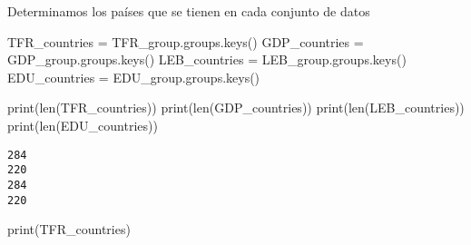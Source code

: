 \documentclass[
  letterpaper,
  DIV=11,
  numbers=noendperiod]{scrreprt}
\newenvironment{Shaded}{\begin{snugshade}}{\end{snugshade}}
\newcommand{\BuiltInTok}[1]{\textcolor[rgb]{0.00,0.23,0.31}{#1}}
\newcommand{\NormalTok}[1]{\textcolor[rgb]{0.00,0.23,0.31}{#1}}
\newcommand{\OperatorTok}[1]{\textcolor[rgb]{0.37,0.37,0.37}{#1}}
\begin{document}
Determinamos los países que se tienen en cada conjunto de datos

\begin{Shaded}
\begin{Highlighting}[]
\NormalTok{TFR\_countries }\OperatorTok{=}\NormalTok{ TFR\_group.groups.keys()}
\NormalTok{GDP\_countries }\OperatorTok{=}\NormalTok{ GDP\_group.groups.keys()}
\NormalTok{LEB\_countries }\OperatorTok{=}\NormalTok{ LEB\_group.groups.keys()}
\NormalTok{EDU\_countries }\OperatorTok{=}\NormalTok{ EDU\_group.groups.keys()}
\end{Highlighting}
\end{Shaded}

\begin{Shaded}
\begin{Highlighting}[]
\BuiltInTok{print}\NormalTok{(}\BuiltInTok{len}\NormalTok{(TFR\_countries))}
\BuiltInTok{print}\NormalTok{(}\BuiltInTok{len}\NormalTok{(GDP\_countries))}
\BuiltInTok{print}\NormalTok{(}\BuiltInTok{len}\NormalTok{(LEB\_countries))}
\BuiltInTok{print}\NormalTok{(}\BuiltInTok{len}\NormalTok{(EDU\_countries))}
\end{Highlighting}
\end{Shaded}

\begin{verbatim}
284
220
284
220
\end{verbatim}

\begin{Shaded}
\begin{Highlighting}[]
\BuiltInTok{print}\NormalTok{(TFR\_countries)}
\end{Highlighting}
\end{Shaded}
\end{document}
